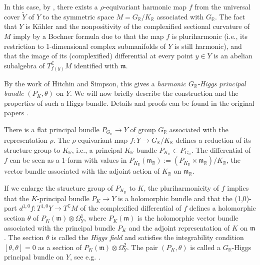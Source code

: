 In this case, by \cite{jep93Cor88}, there exists a $\rho$-equivariant harmonic map $f$ from the universal cover $\widetilde Y$ of $Y$ to the symmetric space $M=G_{\mathbb R}/K_{\mathbb R}$ associated with $G_{\mathbb R}$. The fact that $Y$ is Kähler and the nonpositivity of the complexified sectional curvature of $M$ imply by a Bochner formula due to \cite{jep93Sam78,jep93Siu80} that the map $f$ is pluriharmonic (i.e., its restriction to 1-dimensional complex submanifolds of $Y$ is still harmonic), and that the image of its (complexified) differential at every point $y\in Y$ is an abelian subalgebra of $T^{\mathbb C}_{f(y)}M$ identified with $\mathfrak m$.

By the work of Hitchin and Simpson, this gives a \emph{harmonic $G_{\mathbb R}$-Higgs principal bundle} $(P_K,\theta)$ on $Y$. We will now briefly describe the construction and the properties of such a Higgs bundle. Details and proofs can be found in the original papers \cite{jep93Hit87,jep93Hit92,jep93Sim88,jep93Sim92}.

There is a flat principal bundle $P_{G_{\mathbb R}}\to Y$ of group $G_{\mathbb R}$ associated with the representation $\rho$. The $\rho$-equivariant map $f:\widetilde Y\to G_{\mathbb R}/K_{\mathbb R}$ defines a reduction of its structure group to $K_{\mathbb R}$, i.e., a principal $K_{\mathbb R}$ bundle $P_{K_{\mathbb R}}\subset P_{G_{\mathbb R}}$. The differential of $f$ can be seen as a 1-form with values in $P_{K_{\mathbb R}}(\mathfrak m_{\mathbb R}):=(P_{K_{\mathbb R}}\times\mathfrak m_{\mathbb R})/K_{\mathbb R}$, the vector bundle associated with the adjoint action of $K_{\mathbb R}$ on $\mathfrak m_{\mathbb R}$.

If we enlarge the structure group of $P_{K_{\mathbb R}}$ to $K$, the pluriharmonicity of $f$ implies that the $K$-principal bundle $P_K\to Y$ is a holomorphic bundle and that the (1,0)-part $d^{1,0}f:T^{1,0}Y\to T^{\mathbb C}M$ of the complexified differential of $f$ defines a holomorphic section $\theta$ of $P_K(\mathfrak m)\otimes\Omega_Y^1$, where $P_K(\mathfrak m)$ is the holomorphic vector bundle associated with the principal bundle $P_K$ and the adjoint representation of $K$ on $\mathfrak m$. The section $\theta$ is called the \emph{Higgs field} and satisfies the integrability condition $[\theta,\theta]=0$ as a section of $P_K(\mathfrak m)\otimes\Omega_Y^2$. The pair $(P_K,\theta)$ is called a $G_{\mathbb R}$-Higgs principal bundle on $Y$, see e.g. \cite[\S2.2]{jep93BGPG06}.

